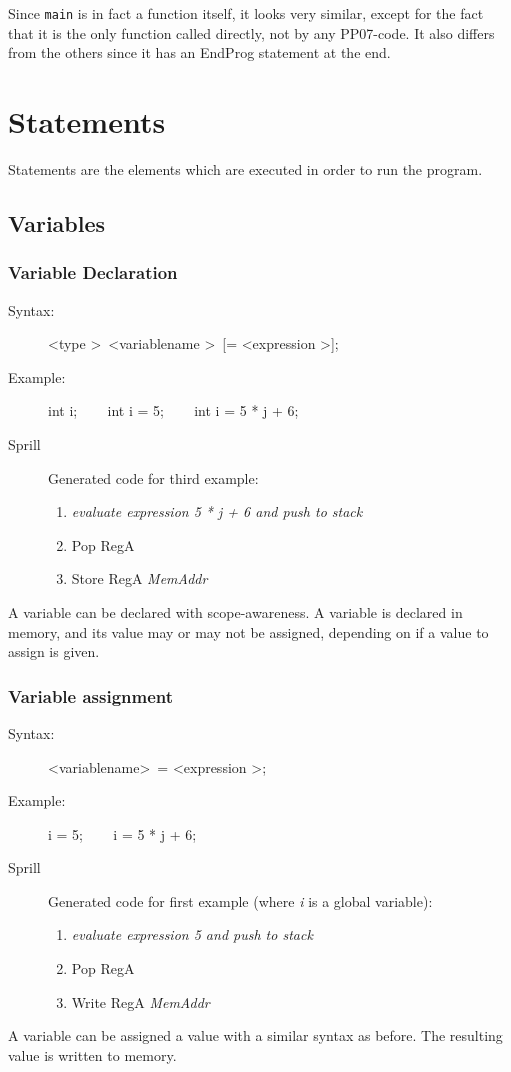 \documentclass[10pt,a4paper]{report}
\begin{document}
Since \texttt{main} is in fact a function itself, it looks very similar, except for the fact that it is the only function called directly, not by any PP07-code. It also differs from the others since it has an EndProg statement at the end.

\section{Statements}
Statements are the elements which are executed in order to run the program.

\subsection{Variables}

\subsubsection*{Variable Declaration}
\begin{description}
	\item[Syntax:] 
		\textless type \textgreater ~\textless variablename \textgreater ~[= \textless expression \textgreater];
	\item[Example:] 
		int i; ~~~ 
		int i = 5;  ~~~ 
		int i = 5 * j + 6;
	\item[Sprill] Generated code for third example:
		\begin{enumerate}
			\item \emph{evaluate expression \emph{5 * j + 6} and push to stack}
			\item Pop RegA
			\item Store RegA \emph{MemAddr}
		\end{enumerate}
\end{description} 
A variable can be declared with scope-awareness. A variable is declared in memory, and its value may or may not be assigned, depending on if a value to assign is given.

\subsubsection*{Variable assignment}

\begin{description}
	\item[Syntax:] 
		\textless variablename\textgreater ~= \textless expression \textgreater;
	\item[Example:] 
		i = 5; ~~~ 
		i = 5 * j + 6;
	\item[Sprill] Generated code for first example (where \emph{i} is a global variable):
		\begin{enumerate}
			\item \emph{evaluate expression \emph{5} and push to stack}
			\item Pop RegA
			\item Write RegA \emph{MemAddr} 
		\end{enumerate}
\end{description} 
A variable can be assigned a value with a similar syntax as before. The resulting value is written to memory.
\end{document}
